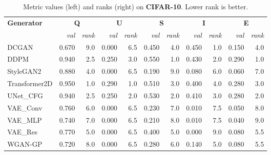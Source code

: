 \begin{table}[H]\centering\scriptsize
\caption{Metric values (left) and ranks (right) on \textbf{CIFAR-10}. Lower rank is better.}
\label{tab:vals-ranks-cifar10}
\begin{tabular}{l rr rr rr rr rr}
\toprule
\multirow{2}{*}{\textbf{Generator}} & \multicolumn{2}{c}{\textbf{Q}} & \multicolumn{2}{c}{\textbf{U}} & \multicolumn{2}{c}{\textbf{S}} & \multicolumn{2}{c}{\textbf{I}} & \multicolumn{2}{c}{\textbf{E}} \\
 & \textit{val} & \textit{rank} & \textit{val} & \textit{rank} & \textit{val} & \textit{rank} & \textit{val} & \textit{rank} & \textit{val} & \textit{rank} \\
\midrule
DCGAN & 0.670 & 9.0 & 0.000 & 6.5 & 0.450 & 4.0 & 0.450 & 1.0 & 0.150 & 4.0 \\
DDPM & 0.940 & 2.5 & 0.250 & 3.0 & 0.550 & 1.0 & 0.430 & 2.0 & 0.290 & 1.0 \\
StyleGAN2 & 0.880 & 4.0 & 0.000 & 6.5 & 0.190 & 9.0 & 0.080 & 6.0 & 0.060 & 7.0 \\
Transformer2D & 0.950 & 1.0 & 0.290 & 1.0 & 0.510 & 3.0 & 0.400 & 4.0 & 0.280 & 3.0 \\
UNet\_CFG & 0.940 & 2.5 & 0.250 & 2.0 & 0.530 & 2.0 & 0.410 & 3.0 & 0.280 & 2.0 \\
VAE\_Conv & 0.760 & 6.0 & 0.000 & 6.5 & 0.230 & 7.0 & 0.010 & 7.5 & 0.050 & 8.0 \\
VAE\_MLP & 0.740 & 7.0 & 0.000 & 6.5 & 0.210 & 8.0 & 0.010 & 7.5 & 0.040 & 9.0 \\
VAE\_Res & 0.770 & 5.0 & 0.000 & 6.5 & 0.400 & 5.0 & 0.000 & 9.0 & 0.080 & 5.5 \\
WGAN-GP & 0.720 & 8.0 & 0.000 & 6.5 & 0.280 & 6.0 & 0.140 & 5.0 & 0.080 & 5.5 \\
\bottomrule
\end{tabular}
\end{table}

